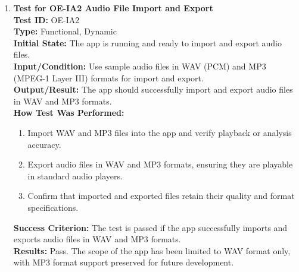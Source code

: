 \documentclass[12pt, titlepage]{article}
\begin{document}
\begin{enumerate}
    \item \textbf{Test for OE-IA2 Audio File Import and Export} \\
      \newline
      \textbf{Test ID:} OE-IA2 \\
      \textbf{Type:} Functional, Dynamic \\
      \textbf{Initial State:} The app is running and ready to import and export audio files. \\
      \textbf{Input/Condition:} Use sample audio files in WAV (PCM) and MP3 (MPEG-1 Layer III) formats for import and export. \\
      \textbf{Output/Result:} The app should successfully import and export audio files in WAV and MP3 formats. \\
      \textbf{How Test Was Performed:}
      \begin{enumerate}
          \item Import WAV and MP3 files into the app and verify playback or analysis accuracy.
          \item Export audio files in WAV and MP3 formats, ensuring they are playable in standard audio players.
          \item Confirm that imported and exported files retain their quality and format specifications.
      \end{enumerate}
      \textbf{Success Criterion:} The test is passed if the app successfully imports and exports audio files in WAV and MP3 formats.\\
      \textbf{Results:} Pass. The scope of the app has been limited to WAV format only, with MP3 format support preserved for future development.\\


\end{enumerate}
\end{document}

